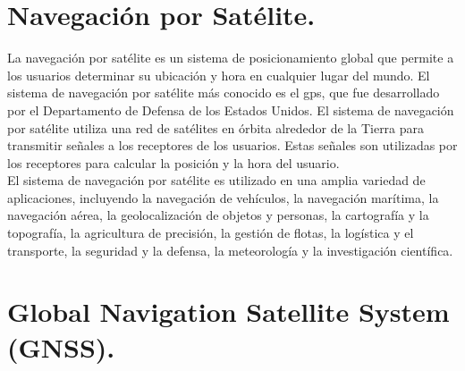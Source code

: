 \section*{\fontsize{12}{18}\selectfont Navegación por Satélite.}

\begin{justify}
    La navegación por satélite es un sistema de posicionamiento global que permite a los usuarios determinar su ubicación y hora en cualquier lugar del mundo.
    El sistema de navegación por satélite más conocido es el \gls{gps}, que fue desarrollado por el Departamento de Defensa de los Estados Unidos.
    El sistema de navegación por satélite utiliza una red de satélites en órbita alrededor de la Tierra para transmitir señales a los receptores de los usuarios.
    Estas señales son utilizadas por los receptores para calcular la posición y la hora del usuario.\\

    El sistema de navegación por satélite es utilizado en una amplia variedad de aplicaciones, incluyendo la navegación de vehículos, la navegación marítima,
    la navegación aérea, la geolocalización de objetos y personas, la cartografía y la topografía, la agricultura de precisión, la gestión de flotas,
    la logística y el transporte, la seguridad y la defensa, la meteorología y la investigación científica.
\end{justify}

\section*{\fontsize{12}{18}\selectfont Global Navigation Satellite System (GNSS).}

